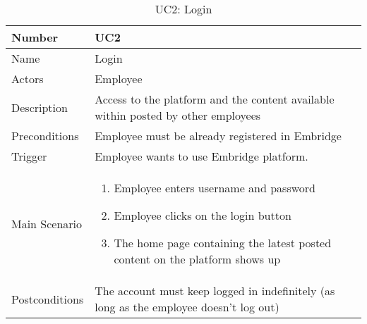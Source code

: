 \documentclass[12pt,a4paper]{article}
\begin{document}
\begin{table}[h]
\centering
\caption{UC2: Login}
\label{tab:uc2}
\begin{tabularx}{\textwidth}{@{}lX@{}}
\toprule
Number & UC2 \\ \midrule
Name & Login \\
Actors & Employee\\
Description &
Access to the platform and the content available within posted by other employees\\
Preconditions & Employee must be already registered in Embridge\\
Trigger & Employee wants to use Embridge platform.\\
Main Scenario & 
\begin{enumerate}
\item Employee enters username and password
\item Employee clicks on the login button
\item The home page containing the latest posted content on the platform shows up
\end{enumerate} \\
Postconditions & The account must keep logged in indefinitely (as long as the employee doesn’t log out) \\
\bottomrule
\end{tabularx}
\end{table}

\end{document}

